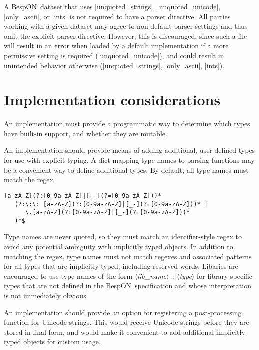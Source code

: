 \documentclass[11pt]{article}
\newcommand{\bespon}{BespON}
\newcommand{\vmeta}[1]{{\color{DarkRed}\ensuremath{\langle}\textit{#1}\ensuremath{\rangle}}}
\begin{document}
{{A \bespon\ dataset that uses |unquoted_strings|, |unquoted_unicode|, |only_ascii|, or |ints| is not required to have a parser directive.  All parties working with a given dataset may agree to non-default parser settings and thus omit the explicit parser directive.  However, this is discouraged, since such a file will result in an error when loaded by a default implementation if a more permissive setting is required (|unquoted_unicode|), and could result in unintended behavior otherwise (|unquoted_strings|, |only_ascii|, |ints|).


\section{Implementation considerations}

An implementation must provide a programmatic way to determine which types have built-in support, and whether they are mutable.

An implementation should provide means of adding additional, user-defined types for use with explicit typing.  A dict mapping type names to parsing functions may be a convenient way to define additional types.  By default, all type names must match the regex
\begin{Verbatim}
[a-zA-Z](?:[0-9a-zA-Z]|[_-](?=[0-9a-zA-Z]))*
   (?:\:\: [a-zA-Z](?:[0-9a-zA-Z]|[_-](?=[0-9a-zA-Z]))* | 
      \.[a-zA-Z](?:[0-9a-zA-Z]|[_-](?=[0-9a-zA-Z]))*
   )*$
\end{Verbatim}
Type names are never quoted, so they must match an identifier-style regex to avoid any potential ambiguity with implicitly typed objects.  In addition to matching the regex, type names must not match regexes and associated patterns for all types that are implicitly typed, including reserved words.  Libaries are encouraged to use type names of the form \vmeta{lib\_name}|::|\vmeta{type} for library-specific types that are not defined in the \bespon\ specification and whose interpretation is not immediately obvious.  

An implementation should provide an option for registering a post-processing function for Unicode strings.  This would receive Unicode strings before they are stored in final form, and would make it convenient to add additional implicitly typed objects for custom usage.









}}
\end{document}

